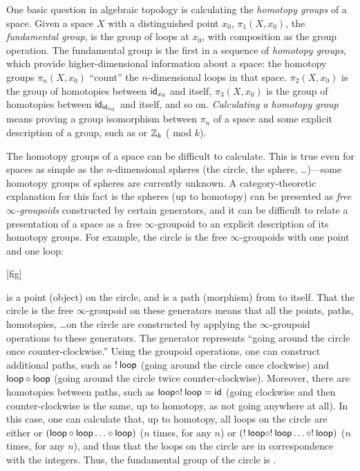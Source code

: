One basic question in algebraic topology is calculating the
\emph{homotopy groups} of a space.  Given a space $X$ with a
distinguished point $x_0$, $\pi_1(X,x_0)$, the \emph{fundamental group},
is the group of loops at $x_0$, with composition as the group operation.
The fundamental group is the first in a sequence of \emph{homotopy
  groups}, which provide higher-dimensional information about a space:
the homotopy groups $\pi_n(X,x_0)$ ``count'' the $n$-dimensional loops in 
that space.  $\pi_2(X,x_0)$ is the group of homotopies between
$\mathsf{id}_{{x_0}}$ and itself, $\pi_3(X,x_0)$ is the group of homotopies
between $\mathsf{id}_{\mathsf{id}_{{x_0}}}$ and itself, and so on.
\emph{Calculating a homotopy group} means proving a group isomorphism
between $\pi_n$ of a space and some explicit description of a group,
such as \Z\/ or $\mathbb{Z}_k$ (\Z\/ mod $k$).  

The homotopy groups of a space can be difficult to calculate.  This is
true even for spaces as simple as the $n$-dimensional spheres (the
circle, the sphere, \ldots)---some homotopy groups of spheres are
currently unknown.  A category-theoretic explanation for this fact is
the spheres (up to homotopy) can be presented as \emph{free
  $\infty$-groupoids} constructed by certain generators, and it can be
difficult to relate a presentation of a space as a free
$\infty$-groupoid to an explicit description of its homotopy groups.
For example, the circle is the free $\infty$-groupoids with one point
and one loop:

[fig]

 is a point (object) on the circle, and  is a path
(morphism) from  to itself.  That the circle is the free
$\infty$-groupoid on these generators means that all the points, paths,
homotopies, \ldots on the circle are constructed by applying the
$\infty$-groupoid operations to these generators.  The generator
 represents ``going around the circle once
counter-clockwise.''  Using the groupoid operations, one can construct
additional paths, such as $! \: \mathsf{loop}$ (going around the circle once
clockwise) and $\mathsf{loop} \mathbin{\circ} \mathsf{loop}$ (going around the circle
twice counter-clockwise).  Moreover, there are homotopies between paths,
such as $\mathsf{loop} \mathbin{\circ} ! \: \mathsf{loop} = \mathsf{id}$ (going clockwise and
then counter-clockwise is the same, up to homotopy, as not going
anywhere at all).  In this case, one can calculate that, up to homotopy,
all loops on the circle are either  or $(\mathsf{loop} \mathbin{\circ}
\mathsf{loop} \ldots \mathbin{\circ} \mathsf{loop})$ ($n$ times, for any $n$) or $(! \: 
\mathsf{loop} \mathbin{\circ} ! \:   \mathsf{loop} \ldots \mathbin{\circ} ! \:  \mathsf{loop})$ ($n$ times,
for any $n$), and thus that the loops on the circle are in
correspondence with the integers.  Thus, the fundamental group of the
circle is \Z.

